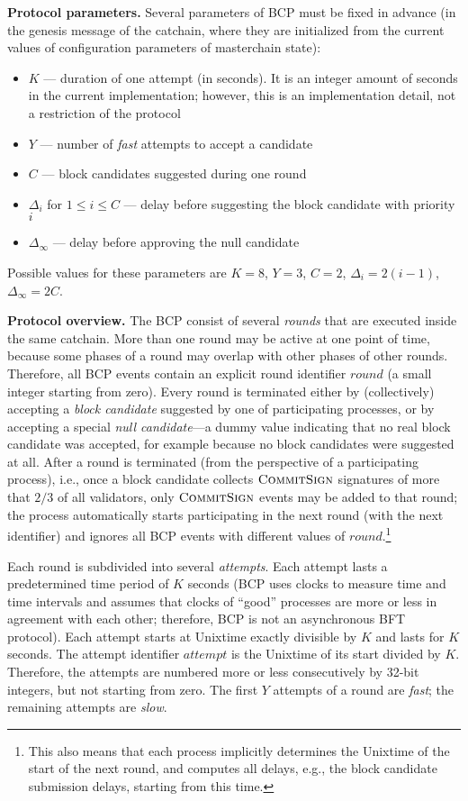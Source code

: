 \documentclass[12pt,oneside]{article}
\def\makepoint#1{\medbreak\noindent{\bf #1.\ }}
\def\nxsubpoint{\refstepcounter{subsubsection}%
  \smallbreak\makepoint{\thesubsubsection}}
\def\emb#1{\textbf{#1.}}
\let\vr=\textit
\def\opsc#1{\operatorname{\textsc{#1}}}
\def\CommitSign{\opsc{CommitSign}}
\def\wround{\vr{round}}
\def\wattempt{\vr{attempt}}
\begin{document}
\nxsubpoint\emb{Protocol parameters}
Several parameters of BCP must be fixed in advance (in the genesis message of the catchain, where they are initialized from the current values of configuration parameters of masterchain state):
\begin{itemize}
\item $K$ --- duration of one attempt (in seconds). It is an integer amount of seconds in the current implementation; however, this is an implementation detail, not a restriction of the protocol
\item $Y$ --- number of {\em fast\/} attempts to accept a candidate
\item $C$ --- block candidates suggested during one round
\item $\Delta_i$ for $1\leq i\leq C$ --- delay before suggesting the block candidate with priority $i$
\item $\Delta_\infty$ --- delay before approving the null candidate
\end{itemize}
Possible values for these parameters are $K=8$, $Y=3$, $C=2$, $\Delta_i=2(i-1)$, $\Delta_\infty=2C$.

\nxsubpoint\emb{Protocol overview}
The BCP consist of several {\em rounds\/} that are executed inside the same catchain. More than one round may be active at one point of time, because some phases of a round may overlap with other phases of other rounds. Therefore, all BCP events contain an explicit round identifier $\wround$ (a small integer starting from zero). Every round is terminated either by (collectively) accepting a {\em block candidate\/} suggested by one of participating processes, or by accepting a special {\em null candidate\/}---a dummy value indicating that no real block candidate was accepted, for example because no block candidates were suggested at all. After a round is terminated (from the perspective of a participating process), i.e., once a block candidate collects $\CommitSign$ signatures of more that $2/3$ of all validators, only $\CommitSign$ events may be added to that round; the process automatically starts participating in the next round (with the next identifier) and ignores all BCP events with different values of $\wround$.\footnote{This also means that each process implicitly determines the Unixtime of the start of the next round, and computes all delays, e.g., the block candidate submission delays, starting from this time.}

Each round is subdivided into several {\em attempts}. Each attempt lasts a predetermined time period of $K$ seconds (BCP uses clocks to measure time and time intervals and assumes that clocks of ``good'' processes are more or less in agreement with each other; therefore, BCP is not an asynchronous BFT protocol). Each attempt starts at Unixtime exactly divisible by $K$ and lasts for $K$ seconds. The attempt identifier $\wattempt$ is the Unixtime of its start divided by $K$. Therefore, the attempts are numbered more or less consecutively by 32-bit integers, but not starting from zero. The first $Y$ attempts of a round are {\em fast\/}; the remaining attempts are {\em slow}.
\end{document}
